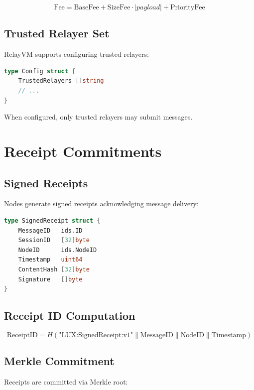 \documentclass[11pt,twocolumn]{article}
\begin{document}
\begin{equation}
\text{Fee} = \text{BaseFee} + \text{SizeFee} \cdot |payload| + \text{PriorityFee}
\end{equation}

\subsection{Trusted Relayer Set}

RelayVM supports configuring trusted relayers:

\begin{lstlisting}[language=Go,basicstyle=\ttfamily\small]
type Config struct {
    TrustedRelayers []string
    // ...
}
\end{lstlisting}

When configured, only trusted relayers may submit messages.

\section{Receipt Commitments}

\subsection{Signed Receipts}

Nodes generate signed receipts acknowledging message delivery:

\begin{lstlisting}[language=Go,basicstyle=\ttfamily\small]
type SignedReceipt struct {
    MessageID   ids.ID
    SessionID   [32]byte
    NodeID      ids.NodeID
    Timestamp   uint64
    ContentHash [32]byte
    Signature   []byte
}
\end{lstlisting}

\subsection{Receipt ID Computation}

\begin{equation}
\text{ReceiptID} = H(\text{"LUX:SignedReceipt:v1"} \| \text{MessageID} \| \text{NodeID} \| \text{Timestamp})
\end{equation}

\subsection{Merkle Commitment}

Receipts are committed via Merkle root:
\end{document}
